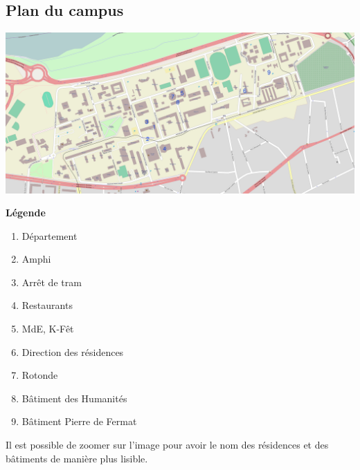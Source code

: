 \subsection{Plan du campus}
\begin{minipage}{0.7\textwidth}
\includegraphics[width=24cm, angle=90]{images/planDoua.jpg}
\end{minipage}
\begin{minipage}{0.3\textwidth}
\textbf{Légende}
    \begin{enumerate}
	\item Département
	\item Amphi
	\item Arrêt de tram
	\item Restaurants
	\item MdE, K-Fêt
	\item Direction des résidences
	\item Rotonde
	\item Bâtiment des Humanités
	\item Bâtiment Pierre de Fermat
    \end{enumerate}
   \vspace{2cm} 
    Il est possible de zoomer sur l'image pour avoir le nom des résidences et
    des bâtiments de manière plus lisible.
\end{minipage}
\newpage

